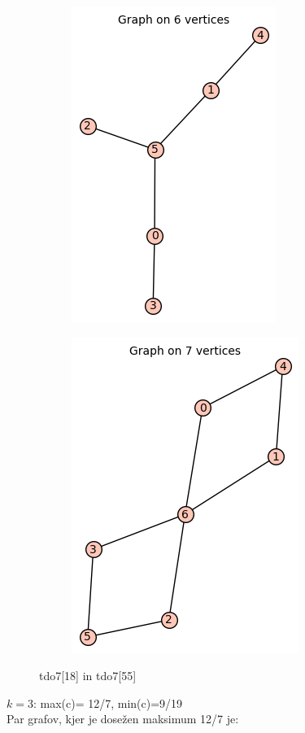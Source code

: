 \documentclass[12pt, a4paper]{article}
\begin{document}
\begin{center}
\begin{figure}[!htb]
\centering
\begin{subfigure}{0.5\textwidth}
  \centering
  \includegraphics[width=0.35\linewidth]{tdo7[18]}
\end{subfigure}%
\begin{subfigure}{0.5\textwidth}
  \centering
  \includegraphics[width=0.35\linewidth]{tdo7[55]}
\end{subfigure}
\caption{tdo7[18] in tdo7[55]}
\label{fig:test}
\end{figure}

\end{center}
\clearpage
$k=3$:  max(c)= 12/7,  min(c)=9/19 \\
Par grafov, kjer je dosežen maksimum 12/7 je:
\end{document}
